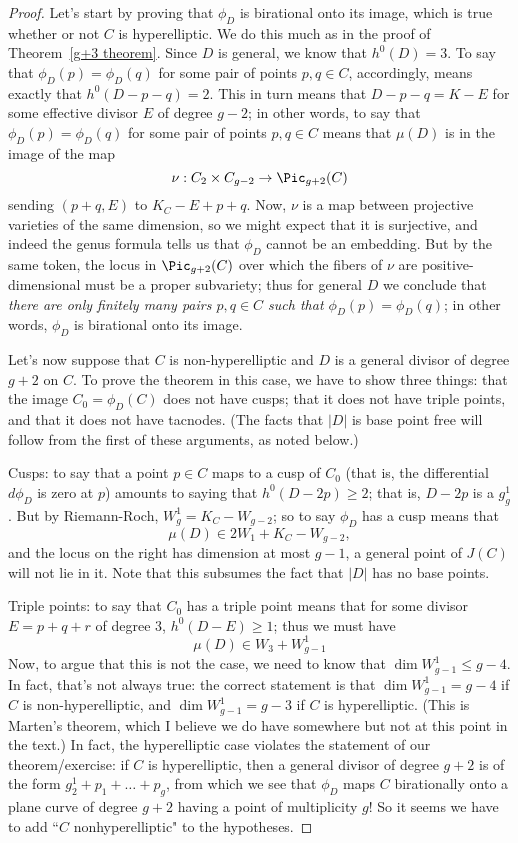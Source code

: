 \begin{proof}
Let's start by proving that $\phi_D$ is birational onto its image, which is true whether or not $C$ is hyperelliptic. We do this much as in the proof of Theorem~\ref{g+3 theorem}. Since $D$ is general, we know that $h^0(D) = 3$. To say that $\phi_D(p) = \phi_D(q)$ for some pair of points $p, q \in C$, accordingly, means exactly that $h^0(D-p-q) = 2$. This in turn means that $D-p-q = K-E$ for some effective divisor $E$ of degree $g-2$; in other words, to say that $\phi_D(p) = \phi_D(q)$ for some pair of points $p, q \in C$ means that $\mu(D)$ is in the image of the map
$$
\nu : C_2 \times C_{g-2} \to \Pic_{g+2}(C)
$$
sending $(p+q, E)$ to $K_C - E + p + q$. Now, $\nu$ is a map between projective varieties of the same dimension, so we might expect that it is surjective, and indeed the genus formula tells us that $\phi_D$ cannot be an embedding. But by the same token, the locus in $\Pic_{g+2}(C)$ over which the fibers of $\nu$ are positive-dimensional must be a proper subvariety; thus for general $D$ we conclude that \emph{there are only finitely many pairs $p, q \in C$ such that $\phi_D(p) = \phi_D(q)$}; in other words, $\phi_D$ is birational onto its image.

Let's now suppose that $C$ is non-hyperelliptic and $D$ is a general divisor of degree $g+2$ on $C$. To prove the theorem in this case, we have to show  three things: that the image $C_0 = \phi_D(C)$ does not have cusps; that it does not have triple points, and that it does not have tacnodes. (The facts that $|D|$ is base point free  will follow from the first of these arguments, as noted below.)

Cusps: to say that a point $p \in C$ maps to a cusp of $C_0$ (that is, the differential $d\phi_D$ is zero at $p$) amounts to saying that $h^0(D-2p) \geq 2$; that is, $D-2p$ is a $g^1_g$. But by Riemann-Roch, $W^1_g = K_C - W_{g-2}$; so to say $\phi_D$ has a cusp means that
$$
\mu(D) \in 2W_1 + K_C - W_{g-2},
$$
and the locus on the right has dimension at most $g-1$, a general point of $J(C)$ will not lie in it. Note that this subsumes the fact that $|D|$ has no base points.

Triple points: to say that $C_0$ has a triple point means that for some divisor $E = p+q+r$ of degree 3, $h^0(D-E) \geq 1$; thus we must have 
$$
\mu(D) \in W_3 + W^1_{g-1}
$$
Now, to argue that this is not the case, we need to know that $\dim W^1_{g-1} \leq g-4$. In fact, that's not always true: the correct statement is that $\dim W^1_{g-1} = g-4$ if $C$ is non-hyperelliptic, and $\dim W^1_{g-1} = g-3$ if $C$ is hyperelliptic. (This is Marten's theorem, which I believe we do have somewhere but not at this point in the text.) In fact, the hyperelliptic case violates the statement of our theorem/exercise: if $C$ is hyperelliptic, then a general divisor of degree $g+2$ is of the form $g^1_2 + p_1+ \dots + p_g$, from which we see that $\phi_D$ maps $C$ birationally onto a plane curve of degree $g+2$ having a point of multiplicity $g$! So it seems we have to add ``$C$ nonhyperelliptic" to the hypotheses.


\end{proof}
